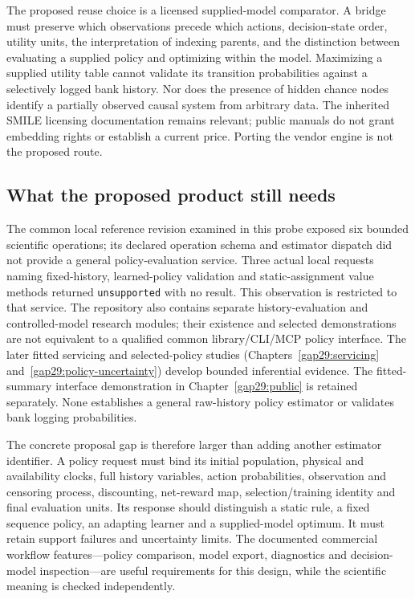 The proposed reuse choice is a licensed supplied-model comparator. A bridge
must preserve which observations precede which actions, decision-state order,
utility units, the interpretation of indexing parents, and the distinction
between evaluating a supplied policy and optimizing within the model.
Maximizing a supplied utility table cannot validate its transition probabilities
against a selectively logged bank history. Nor does the presence of hidden
chance nodes identify a partially observed causal system from arbitrary data.
The inherited SMILE licensing documentation remains relevant; public manuals
do not grant embedding rights or establish a current price. Porting the vendor
engine is not the proposed route. \citep{exec16_cp_bayesfusion,exec13_smile_license}

\subsection{What the proposed product still needs}

The common local reference revision examined in this probe exposed six
bounded scientific operations; its declared operation schema and estimator
dispatch did not provide a general policy-evaluation service. Three actual local requests naming fixed-history,
learned-policy validation and static-assignment value methods returned
\texttt{unsupported} with no result. This observation is restricted to that
service. The repository also contains separate history-evaluation and
controlled-model research modules; their existence and selected demonstrations
are not equivalent to a qualified common library/CLI/MCP policy interface.
The later fitted servicing and selected-policy studies
(Chapters~\ref{gap29:servicing} and~\ref{gap29:policy-uncertainty}) develop
bounded inferential evidence. The fitted-summary interface demonstration in
Chapter~\ref{gap29:public} is retained separately. None establishes a general
raw-history policy estimator or validates bank logging probabilities.
\citep{exec16_cp_runtime}

The concrete proposal gap is therefore larger than adding another estimator
identifier. A policy request must bind its initial population, physical and
availability clocks, full history variables, action probabilities, observation
and censoring process, discounting, net-reward map, selection/training identity
and final evaluation units. Its response should distinguish a static rule,
a fixed sequence policy, an adapting learner and a supplied-model optimum.
It must retain support failures and uncertainty limits. The documented
commercial workflow features---policy comparison, model export, diagnostics
and decision-model inspection---are useful requirements for this design, while
the scientific meaning is checked independently. \citep{exec16_cp_matrix}

